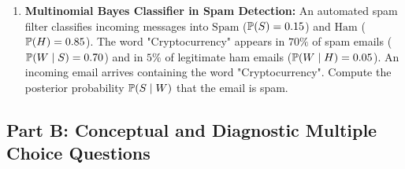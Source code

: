 \begin{enumerate}
    \item \textbf{Multinomial Bayes Classifier in Spam Detection:} An automated spam filter classifies incoming messages into $\text{Spam}$ ($\P(S) = 0.15$) and $\text{Ham}$ ($\P(H) = 0.85$). The word "Cryptocurrency" appears in $70\%$ of spam emails ($\P(W \mid S) = 0.70$) and in $5\%$ of legitimate ham emails ($\P(W \mid H) = 0.05$). An incoming email arrives containing the word "Cryptocurrency". Compute the posterior probability $\P(S \mid W)$ that the email is spam.
\end{enumerate}

\subsection*{Part B: Conceptual and Diagnostic Multiple Choice Questions}

